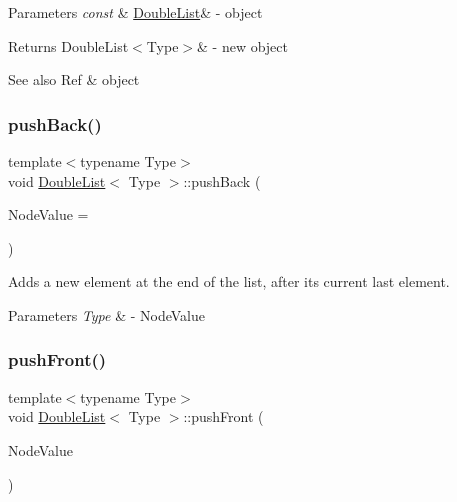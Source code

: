 \begin{DoxyParams}{Parameters}
{\em const} & \hyperlink{classDoubleList}{Double\+List}\& -\/ object \\
\hline
\end{DoxyParams}
\begin{DoxyReturn}{Returns}
Double\+List$<$\+Type$>$\& -\/ new object 
\end{DoxyReturn}
\begin{DoxySeeAlso}{See also}
Ref \& object 
\end{DoxySeeAlso}
\mbox{\label{classDoubleList_ad837f0847d561642747af47645952cfd}} 
\subsubsection{\texorpdfstring{push\+Back()}{pushBack()}}
{\footnotesize\ttfamily template$<$typename Type$>$ \\
void \hyperlink{classDoubleList}{Double\+List}$<$ Type $>$\+::push\+Back (\begin{DoxyParamCaption}\item[{Type}]{Node\+Value = {} }\end{DoxyParamCaption})}



Adds a new element at the end of the list, after its current last element. 


\begin{DoxyParams}{Parameters}
{\em Type} & -\/ Node\+Value \\
\hline
\end{DoxyParams}
\mbox{\label{classDoubleList_acc64af7f09918c9b93bbb2e0acbe3b99}} 
\subsubsection{\texorpdfstring{push\+Front()}{pushFront()}}
{\footnotesize\ttfamily template$<$typename Type$>$ \\
void \hyperlink{classDoubleList}{Double\+List}$<$ Type $>$\+::push\+Front (\begin{DoxyParamCaption}\item[{Type}]{Node\+Value }\end{DoxyParamCaption})}



